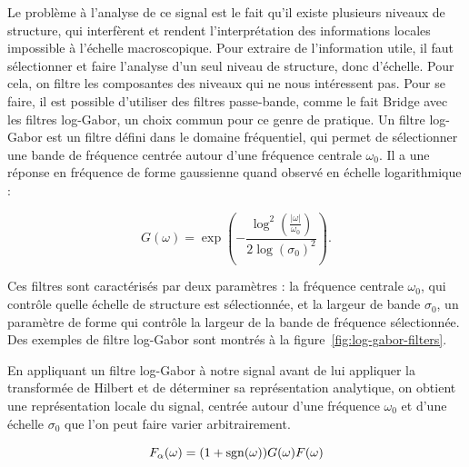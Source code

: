 Le problème à l'analyse de ce signal est le fait qu'il existe plusieurs niveaux de structure, qui interfèrent et rendent l'interprétation des informations locales impossible à l'échelle macroscopique.
Pour extraire de l'information utile, il faut sélectionner et faire l'analyse d'un seul niveau de structure, donc d'échelle.
Pour cela, on filtre les composantes des niveaux qui ne nous intéressent pas.
Pour se faire, il est possible d'utiliser des filtres passe-bande, comme le fait Bridge avec les filtres log-Gabor, un choix commun pour ce genre de pratique.
Un filtre log-Gabor est un filtre défini dans le domaine fréquentiel, qui permet de sélectionner une bande de fréquence centrée autour d'une fréquence centrale $\omega_0$.
Il a une réponse en fréquence de forme gaussienne quand observé en échelle logarithmique :

\begin{equation}
    G(\omega) = \exp\left(-\frac{\log^2(\frac{|\omega|}{\omega_0})}{2\log(\sigma_0)^2}\right).
\end{equation}

Ces filtres sont caractérisés par deux paramètres : la fréquence centrale $\omega_0$, qui contrôle quelle échelle de structure est sélectionnée, et la largeur de bande $\sigma_0$, un paramètre de forme qui contrôle la largeur de la bande de fréquence sélectionnée. Des exemples de filtre log-Gabor sont montrés à la figure~\ref{fig:log-gabor-filters}.

\bigskip

En appliquant un filtre log-Gabor à notre signal avant de lui appliquer la transformée de Hilbert et de déterminer sa représentation analytique, on obtient une représentation locale du signal, centrée autour d'une fréquence $\omega_0$ et d'une échelle $\sigma_0$ que l'on peut faire varier arbitrairement.

\begin{equation}
    F_{\alpha}(\omega) = (1+\operatorname{sgn}(\omega))G(\omega)F(\omega)
\end{equation}


